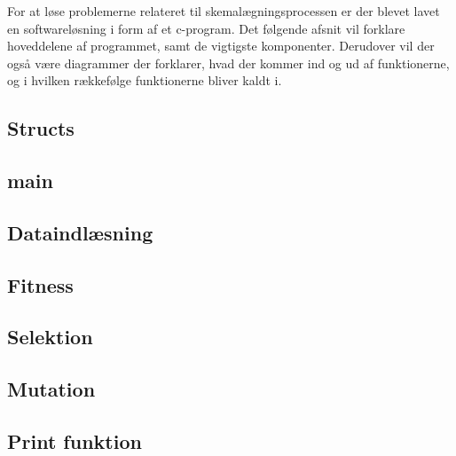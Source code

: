 
For at løse problemerne relateret til skemalægningsprocessen er der blevet lavet en softwareløsning i form af et c-program. Det følgende afsnit vil forklare hoveddelene af programmet, samt de vigtigste komponenter. Derudover vil der også være diagrammer der forklarer, hvad der kommer ind og ud af funktionerne, og i hvilken rækkefølge funktionerne bliver kaldt i.

\subsection{Structs}
  

\subsection{main}
  

\subsection{Dataindlæsning}
  

\subsection{Fitness}
  

\subsection{Selektion}
  

\subsection{Mutation}
  

\subsection{Print funktion}

